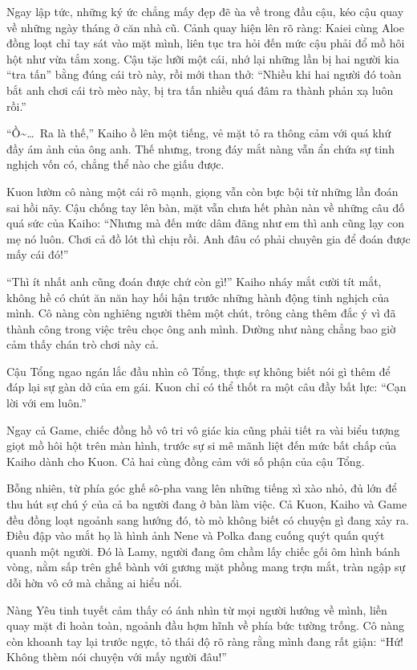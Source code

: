\documentclass[../main.tex]{subfiles}
\begin{document}
Ngay lập tức, những ký ức chẳng mấy đẹp đẽ ùa về trong đầu cậu, kéo cậu quay về những ngày tháng ở căn nhà cũ. Cảnh quay hiện lên rõ ràng: Kaiei cùng Aloe đồng loạt chỉ tay sát vào mặt mình, liên tục tra hỏi đến mức cậu phải đổ mồ hôi hột như vừa tắm xong. Cậu tặc lưỡi một cái, nhớ lại những lần bị hai người kia ``tra tấn'' bằng đúng cái trò này, rồi mới than thở: ``Nhiều khi hai người đó toàn bắt anh chơi cái trò mèo này, bị tra tấn nhiều quá đâm ra thành phản xạ luôn rồi.''

``Ồ\~{}\dots\ Ra là thế,'' Kaiho ồ lên một tiếng, vẻ mặt tỏ ra thông cảm với quá khứ đầy ám ảnh của ông anh. Thế nhưng, trong đáy mắt nàng vẫn ẩn chứa sự tinh nghịch vốn có, chẳng thể nào che giấu được.

Kuon lườm cô nàng một cái rõ mạnh, giọng vẫn còn bực bội từ những lần đoán sai hồi nãy. Cậu chống tay lên bàn, mặt vẫn chưa hết phàn nàn về những câu đố quá sức của Kaiho: ``Nhưng mà đến mức dâm đãng như em thì anh cũng lạy con mẹ nó luôn. Chơi cả đồ lót thì chịu rồi. Anh đâu có phải chuyên gia để đoán được mấy cái đó!''

``Thì ít nhất anh cũng đoán được chứ còn gì!'' Kaiho nháy mắt cười tít mắt, không hề có chút ăn năn hay hối hận trước những hành động tinh nghịch của mình. Cô nàng còn nghiêng người thêm một chút, trông càng thêm đắc ý vì đã thành công trong việc trêu chọc ông anh mình. Dường như nàng chẳng bao giờ cảm thấy chán trò chơi này cả.

Cậu Tổng ngao ngán lắc đầu nhìn cô Tổng, thực sự không biết nói gì thêm để đáp lại sự gàn dở của em gái. Kuon chỉ có thể thốt ra một câu đầy bất lực: ``Cạn lời với em luôn.''

Ngay cả Game, chiếc đồng hồ vô tri vô giác kia cũng phải tiết ra vài biểu tượng giọt mồ hôi hột trên màn hình, trước sự si mê mãnh liệt đến mức bất chấp của Kaiho dành cho Kuon. Cả hai cùng đồng cảm với số phận của cậu Tổng.

Bỗng nhiên, từ phía góc ghế sô-pha vang lên những tiếng xì xào nhỏ, đủ lớn để thu hút sự chú ý của cả ba người đang ở bàn làm việc. Cả Kuon, Kaiho và Game đều đồng loạt ngoảnh sang hướng đó, tò mò không biết có chuyện gì đang xảy ra. Điều đập vào mắt họ là hình ảnh Nene và Polka đang cuống quýt quấn quýt quanh một người. Đó là Lamy, người đang ôm chầm lấy chiếc gối ôm hình bánh vòng, nằm sấp trên ghế bành với gương mặt phồng mang trợn mắt, tràn ngập sự dỗi hờn vô cớ mà chẳng ai hiểu nổi.


Nàng Yêu tinh tuyết cảm thấy có ánh nhìn từ mọi người hướng về mình, liền quay mặt đi hoàn toàn, ngoảnh đầu hợm hĩnh về phía bức tường trống. Cô nàng còn khoanh tay lại trước ngực, tỏ thái độ rõ ràng rằng mình đang rất giận: ``Hứ! Không thèm nói chuyện với mấy người đâu!''
\end{document}
